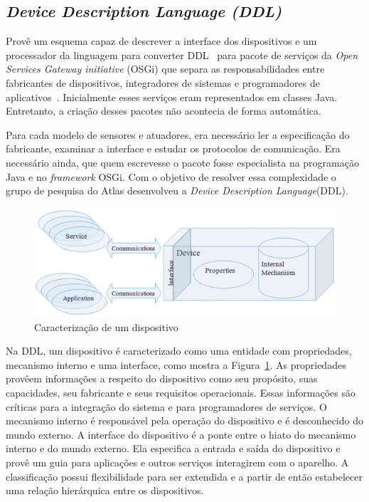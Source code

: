 \subsection{\emph{Device Description Language (DDL)}}
\label{subsec:ddl}

Provê um esquema capaz de descrever a interface dos dispositivos e um processador da linguagem para converter DDL~\cite{gatorTechDDL} para pacote de serviços da \emph{Open Services Gateway initiative} (OSGi) que separa as responsabilidades entre fabricantes de dispositivos, integradores de sistemas e programadores de aplicativos~\cite{gatorTechDDL}. Inicialmente esses serviços eram representados em classes Java. Entretanto, a criação desses pacotes não acontecia de forma automática. 

Para cada modelo de sensores e atuadores, era necessário ler a especificação do fabricante, examinar a interface e estudar os protocolos de comunicação. Era necessário ainda, que quem escrevesse o pacote fosse especialista na programação Java e no \emph{framework} OSGi. Com o objetivo de resolver essa complexidade o grupo de pesquisa do Atlas desenvolveu a \emph{Device Description Language}(DDL).

\begin{figure}[ht]
\center
\includegraphics[scale=0.4]{imagens/gatorDDL}
\caption{Caracterização de um dispositivo~\cite{ddlSpec}}
\label{fig:ddlspec}
\end{figure}

Na DDL, um dispositivo é caracterizado como uma entidade com propriedades, mecanismo interno e uma interface, como mostra a Figura~\ref{fig:ddlspec}. As propriedades provêem informações a respeito do dispositivo como seu propósito, suas capacidades, seu fabricante e seus requisitos operacionais. Essas informações são críticas para a integração do sistema e para programadores de serviços. O mecanismo interno é responsável pela operação do dispositivo e é desconhecido do mundo externo. A interface do dispositivo é a ponte entre o hiato do mecanismo interno e do mundo externo. Ela especifica a entrada e saída do dispositivo e provê um guia para aplicações e outros serviços interagirem com o aparelho. A classificação possui flexibilidade para ser extendida e a partir de então estabelecer uma relação hierárquica entre os dispositivos.

